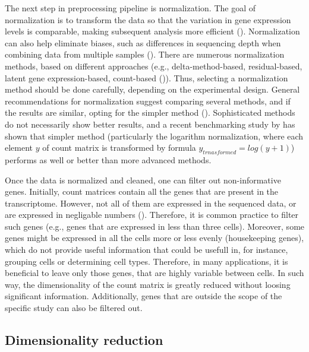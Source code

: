 The next step in preprocessing pipeline is normalization.
The goal of normalization is to transform the data so that the variation in gene expression levels is comparable,
making subsequent analysis more efficient (\cite{Ahlmann2023}).
Normalization can also help eliminate biases,
such as differences in sequencing depth when combining data from multiple samples (\cite{Lingen2024}).
There are numerous normalization methods, based on different approaches
(e.g., delta-method-based, residual-based, latent gene expression-based, count-based (\cite{Ahlmann2023})).
Thus, selecting a normalization method should be done carefully, depending on the experimental design.
General recommendations for normalization suggest comparing several methods,
and if the results are similar, opting for the simpler method (\cite{Lingen2024}).
Sophisticated methods do not necessarily show better results, and a recent benchmarking study by \textcite{Ahlmann2023}
has shown that simpler method (particularly the logarithm normalization,
where each element $y$ of count matrix is transformed by formula $y_{trnasformed} = log(y+1)$)
performs as well or better than more advanced methods.

Once the data is normalized and cleaned, one can filter out non-informative genes.
Initially, count matrices contain all the genes that are present in the transcriptome.
However, not all of them are expressed in the sequenced data, or are expressed in negligable numbers (\cite{Heumos2023}).
Therefore, it is common practice to filter such genes (e.g., genes that are expressed in less than three cells).
Moreover, some genes might be expressed in all the cells more or less evenly (housekeeping genes),
which do not provide useful information that could be usefull in, for instance, grouping cells or determining cell types.
Therefore, in many applications, it is beneficial to leave only those genes, that are highly variable between cells.
In such way, the dimensionality of the count matrix is greatly reduced without loosing significant information.
Additionally, genes that are outside the scope of the specific study can also be filtered out.

\subsection{Dimensionality reduction}

